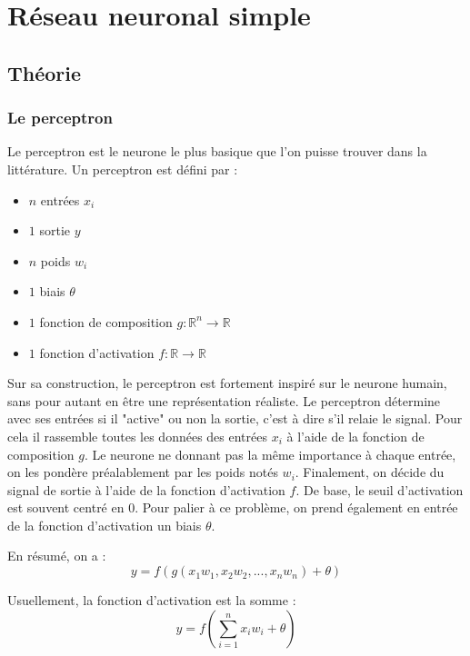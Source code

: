 
\chapter{Réseau neuronal simple}

\section{Théorie}

\subsection{Le perceptron}

Le perceptron est le neurone le plus basique que l'on puisse trouver dans la
littérature. Un perceptron est défini par :
\begin{itemize}
\item $n$ entrées $x_i$
\item $1$ sortie $y$
\item $n$ poids $w_i$
\item $1$ biais $\theta$
\item $1$ fonction de composition $g : \mathbb{R}^n \to \mathbb{R}$
\item $1$ fonction d'activation $f : \mathbb{R} \to \mathbb{R}$
\end{itemize}

\vspace{\parskip}
Sur sa construction, le perceptron est fortement inspiré sur le neurone humain,
sans pour autant en être une représentation réaliste.
Le perceptron détermine avec ses entrées si il "active" ou non la sortie, c'est
à dire s'il relaie le signal. Pour cela il rassemble toutes les données des
entrées $x_i$ à l'aide de la fonction de composition $g$. Le neurone ne donnant
pas la même importance à chaque entrée, on les pondère préalablement par les
poids notés $w_i$.
Finalement, on décide du signal de sortie à l'aide de la fonction d'activation
$f$. De base, le seuil d'activation est souvent centré en $0$. Pour palier à ce
problème, on prend également en entrée de la fonction d'activation un biais
$\theta$.

\medskip

En résumé, on a :
\[y = f(g(x_1w_1, x_2w_2, ... , x_nw_n) + \theta) \]

\medskip

Usuellement, la fonction d'activation est la somme :
\[y = f(\sum_{i=1}^n x_iw_i + \theta) \]

